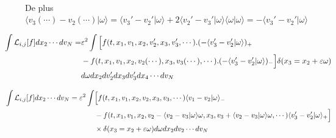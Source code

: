 \documentclass[12pt,a4paper]{article}
\begin{document}
\begin{dem}
\begin{minipage}[t]{18cm}
	 	 	\\
	 	 	De plus $\langle v_3(\cdots)-v_2(\cdots)|\omega\rangle = \langle v_3'-v_2'|\omega\rangle + 2 \langle v_2'-v_3'|\omega\rangle\langle\omega|\omega\rangle = - \langle v_3'-v_2'|\omega\rangle$
	 	 	
	 	 	\[
	 	 	\hspace{-1cm}\begin{aligned}
	 	 		\displaystyle\int \mathcal L_{i,j}[f]dx_2 \cdots dv_N 
	 	 		=& \varepsilon^2\int \Big[f(t,x_1,v_1,x_2,v_2',x_3,v_3',\cdots).(-\langle v_3'-v_2'|\omega\rangle)_+ \\
	 	 		& - f(t,x_1,v_1,x_2,v_2(\cdots),x_3,v_3(\cdots),\cdots).(-\langle v_3'-v_2'|\omega\rangle)_-\Big] \delta(x_3=x_2+\varepsilon\omega)\\
	 	 		& d\omega dx_2 dv_2'dx_3dv_3' dx_4 \cdots dv_N
	 	 	\end{aligned}
	 	 	\]
	 	 	
	 	 	
	 	 	\[
	 	 	\hspace{-1cm}\begin{aligned}
	 	 		\displaystyle\int \mathcal L_{i,j}[f]dx_2 \cdots dv_N 
	 	 		= \varepsilon^2\int& \Big[f(t,x_1,v_1,x_2,v_2,x_3,v_3,\cdots)\langle v_1-v_2|\omega\rangle_- \\
	 	 		& - f(t,x_1,v_1,x_2,v_2-\langle v_2-v_3|\omega\rangle\omega,x_3,v_3 + \langle v_2-v_3|\omega\rangle\omega,\cdots) \langle v_3'-v_2'|\omega\rangle_+\Big] \\
	 	 		& \times\delta(x_3=x_2+\varepsilon\omega)d\omega dx_2 dv_2\cdots dv_N
	 	 	\end{aligned}
	 	 	\]
	 	 	
		 \end{minipage}
		 

\end{dem}
\end{document}
